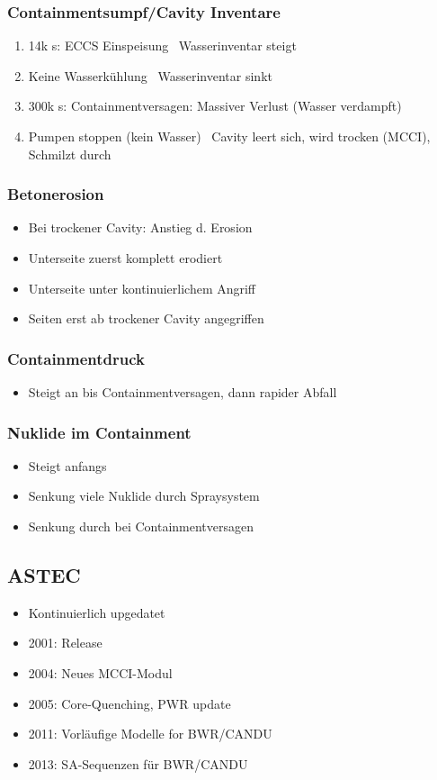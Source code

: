 \documentclass[12pt]{article}
\begin{document}
\subsubsection{Containmentsumpf/Cavity Inventare}
\begin{enumerate}
	\item 14k s: ECCS Einspeisung \textrightarrow\ Wasserinventar steigt
	\item Keine Wasserkühlung \textrightarrow\ Wasserinventar sinkt
	\item 300k s: Containmentversagen: Massiver Verlust (Wasser verdampft)
	\item Pumpen stoppen (kein Wasser) \textrightarrow\ Cavity leert sich, wird trocken (MCCI), Schmilzt durch
\end{enumerate}

\subsubsection{Betonerosion}
\begin{itemize}[noitemsep]
	\item Bei trockener Cavity: Anstieg d. Erosion
	\item Unterseite zuerst komplett erodiert
	\item Unterseite unter kontinuierlichem Angriff
	\item Seiten erst ab trockener Cavity angegriffen
\end{itemize}

\subsubsection{Containmentdruck}
\begin{itemize}[noitemsep]
	\item Steigt an bis Containmentversagen, dann rapider Abfall
\end{itemize}

\subsubsection{Nuklide im Containment}
\begin{itemize}[noitemsep]
	\item Steigt anfangs
	\item Senkung viele Nuklide durch Spraysystem
	\item Senkung durch bei Containmentversagen
\end{itemize}

\subsection{ASTEC}
\begin{itemize}[noitemsep]
	\item Kontinuierlich upgedatet
	\item 2001: Release
	\item 2004: Neues MCCI-Modul
	\item 2005: Core-Quenching, PWR update
	\item 2011: Vorläufige Modelle for BWR/CANDU
	\item 2013: SA-Sequenzen für BWR/CANDU
\end{itemize}
\end{document}
